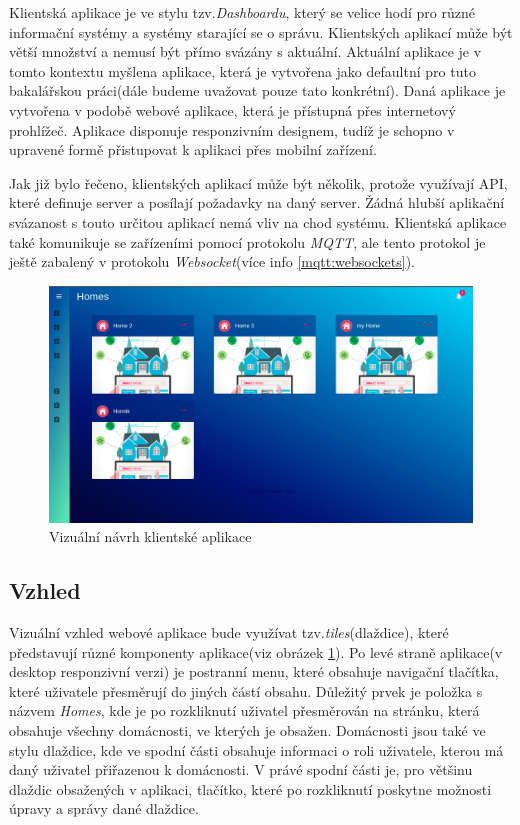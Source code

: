 Klientská aplikace je ve stylu tzv.\emph{Dashboardu}, který se velice hodí pro různé informační systémy a systémy starající se o správu.
Klientských aplikací může být větší množství a nemusí být přímo svázány s aktuální.
Aktuální aplikace je v tomto kontextu myšlena aplikace, která je vytvořena jako defaultní pro tuto bakalářskou práci(dále budeme uvažovat pouze tato konkrétní).
Daná aplikace je vytvořena v podobě webové aplikace, která je přístupná přes internetový prohlížeč.
Aplikace disponuje responzivním designem, tudíž je schopno v upravené formě přistupovat k aplikaci přes mobilní zařízení.

Jak již bylo řečeno, klientských aplikací může být několik, protože využívají API, které definuje server a posílají požadavky na daný server.
Žádná hlubší aplikační svázanost s touto určitou aplikací nemá vliv na chod systému.
Klientská aplikace také komunikuje se zařízeními pomocí protokolu \emph{MQTT}, ale tento protokol je ještě zabalený v protokolu \emph{Websocket}(více info \ref{mqtt:websockets}).

\begin{figure}[hbt]
  \centering
  \includegraphics[width=0.9 \linewidth]{obrazky-figures/mockup.png}
  \caption{Vizuální návrh klientské aplikace}
  \label{figure:design}
\end{figure}

\newpage
\subsection*{Vzhled}
\label{frontend:vzhled}
Vizuální vzhled webové aplikace bude využívat tzv.\emph{tiles}(dlaždice), které představují různé komponenty aplikace(viz obrázek \ref{figure:design}).
Po levé straně aplikace(v desktop responzivní verzi) je postranní menu, které obsahuje navigační tlačítka, které uživatele přesměrují do jiných částí obsahu.
Důležitý prvek je položka s názvem \emph{Homes}, kde je po rozkliknutí uživatel přesměrován na stránku, která obsahuje všechny domácnosti, ve kterých je obsažen.
Domácnosti jsou také ve stylu dlaždice, kde ve spodní části obsahuje informaci o roli uživatele, kterou má daný uživatel přiřazenou k domácnosti.
V právé spodní části je, pro většinu dlaždic obsažených v aplikaci, tlačítko, které po rozkliknutí poskytne možnosti úpravy a správy dané dlaždice.

